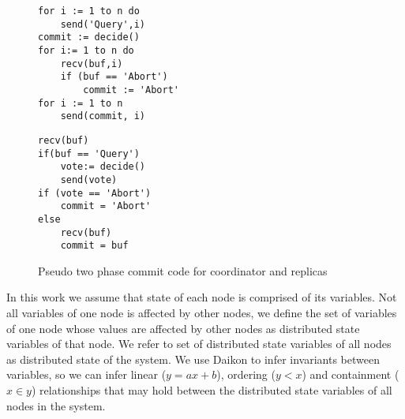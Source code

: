\begin{figure}
\centering
\begin{minipage}{.45\textwidth}
\begin{lstlisting}[caption={Coordinator Code}]
for i := 1 to n do
	send('Query',i)
commit := decide()
for i:= 1 to n do
	recv(buf,i)
	if (buf == 'Abort')
		commit := 'Abort'
for i := 1 to n
	send(commit, i)
\end{lstlisting}
\end{minipage}\hfill
\begin{minipage}{.45\textwidth}
\begin{lstlisting}[caption={Replica Code}]
recv(buf)
if(buf == 'Query')
	vote:= decide()
	send(vote)
if (vote == 'Abort')
	commit = 'Abort'
else
	recv(buf)
	commit = buf
\end{lstlisting}
\end{minipage}\hfill
\caption{Pseudo two phase commit code for coordinator and replicas}
\label{lst:2pc}
\end{figure}



In this work we 
assume that state of each node is comprised of its variables. Not all variables of one node is affected by other nodes, we define the set of variables of one node whose values are affected by other nodes as distributed state variables of that node. We refer to set of distributed 
state variables of all nodes as distributed state of the system. We use Daikon \cite{ernst2001dynamically} to infer invariants between variables, so we can infer linear ($y = ax + b$), ordering ($y < x$) and containment ($x \in y$) relationships that may hold between the distributed state variables of all nodes in the system.



